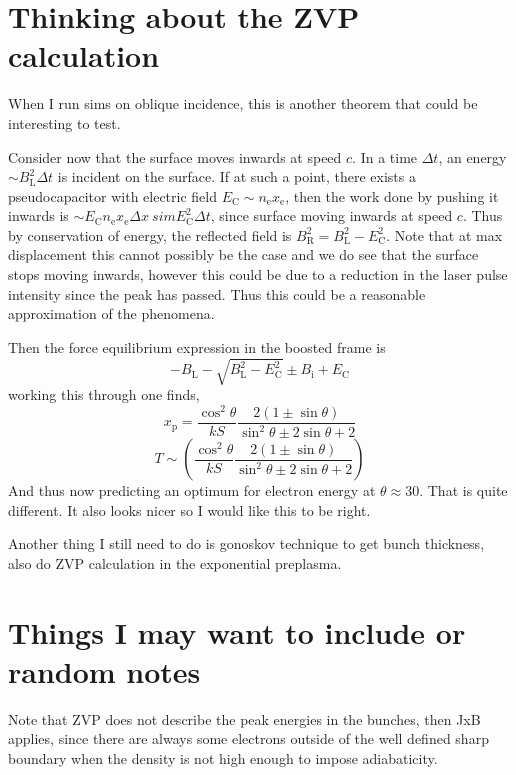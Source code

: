 \section{Thinking about the ZVP calculation}
When I run sims on oblique incidence, this is another theorem that could be interesting to test.

Consider now that the surface moves inwards at speed $c$. In a time $\Delta t$, an energy $\sim B_\mathrm{L}^2\Delta t$ is incident on the surface. If at such a point, there exists a pseudocapacitor with electric field $E_\mathrm{C} \sim n_\mathrm{e}x_\mathrm{e}$, then the work done by pushing it inwards is $\sim E_\mathrm{C} n_\mathrm{e}x_\mathrm{e} \Delta x \ sim E_\mathrm{C}^2\Delta t$, since surface moving inwards at speed $c$. Thus by conservation of energy, the reflected field is $B_\mathrm{R}^2 = B_\mathrm{L}^2 - E_\mathrm{C}^2$. Note that at max displacement this cannot possibly be the case and we do see that the surface stops moving inwards, however this could be due to a reduction in the laser pulse intensity since the peak has passed. Thus this could be a reasonable approximation of the phenomena.

Then the force equilibrium expression in the boosted frame is
\begin{equation}
	-B_\mathrm{L} - \sqrt{B_\mathrm{L}^2 - E_\mathrm{C}^2} \pm B_\mathrm{i} + E_\mathrm{C}
\end{equation}
working this through one finds,
\begin{equation}
	x_\mathrm{p} = \frac{\cos^2\theta}{kS}\frac{2(1\pm \sin\theta)}{\sin^2\theta \pm 2\sin\theta +2}
\end{equation}
\begin{equation}
	T \sim \left(\frac{\cos^2\theta}{kS}\frac{2(1\pm \sin\theta)}{\sin^2\theta \pm 2\sin\theta +2}\right)
\end{equation}
And thus now predicting an optimum for electron energy at $\theta \approx 30$\degree. That is quite different. It also looks nicer so I would like this to be right.

Another thing I still need to do is gonoskov technique to get bunch thickness, also do ZVP calculation in the exponential preplasma.


\section{Things I may want to include or random notes}
Note that ZVP does not describe the peak energies in the bunches, then JxB applies, since there are always some electrons outside of the well defined sharp boundary when the density is not high enough to impose adiabaticity. 